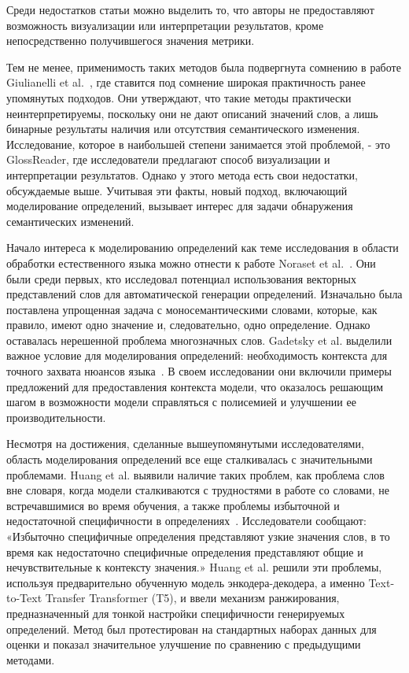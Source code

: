 \documentclass[LI,VKR]{HSEUniversity}
\begin{document}
Среди недостатков статьи можно выделить то, что авторы не предоставляют возможность визуализации
или интерпретации результатов, кроме непосредственно получившегося значения метрики.

Тем не менее, применимость таких методов была подвергнута сомнению в работе
Giulianelli et al.~\cite{DefinitionGenerationMainArticle},
где ставится под сомнение широкая практичность ранее упомянутых подходов.
Они утверждают, что такие методы практически неинтерпретируемы,
поскольку они не дают описаний значений слов,
а лишь бинарные результаты наличия или отсутствия семантического изменения.
Исследование, которое в наибольшей степени занимается этой проблемой, - это GlossReader,
где исследователи предлагают способ визуализации и интерпретации результатов.
Однако у этого метода есть свои недостатки, обсуждаемые выше.
Учитывая эти факты, новый подход, включающий моделирование определений,
вызывает интерес для задачи обнаружения семантических изменений.

Начало интереса к моделированию определений как теме исследования
в области обработки естественного языка можно отнести
к работе Noraset et al.~\cite{noraset2016definition}.
Они были среди первых, кто исследовал потенциал использования векторных представлений слов
для автоматической генерации определений.
Изначально была поставлена упрощенная задача с моносемантическими словами,
которые, как правило, имеют одно значение и, следовательно, одно определение.
Однако оставалась нерешенной проблема многозначных слов.
Gadetsky et al. выделили важное условие для моделирования определений:
необходимость контекста для точного захвата нюансов языка~\cite{gadetsky-etal-2018-conditional}.
В своем исследовании они включили примеры предложений для предоставления контекста модели,
что оказалось решающим шагом в возможности модели справляться с полисемией и улучшении
ее производительности.

Несмотря на достижения, сделанные вышеупомянутыми исследователями,
область моделирования определений все еще сталкивалась с значительными проблемами.
Huang et al. выявили наличие таких проблем,
как проблема слов вне словаря, когда модели сталкиваются с трудностями в работе со словами,
не встречавшимися во время обучения, а также проблемы избыточной и недостаточной
специфичности в определениях~\cite{huang-etal-2021-definition}.
Исследователи сообщают: «Избыточно специфичные определения представляют узкие значения слов,
в то время как недостаточно специфичные определения представляют общие и
нечувствительные к контексту значения.»
Huang et al. решили эти проблемы,
используя предварительно обученную модель энкодера-декодера,
а именно Text-to-Text Transfer Transformer (T5),
и ввели механизм ранжирования, предназначенный для тонкой настройки специфичности
генерируемых определений.
Метод был протестирован на стандартных наборах данных для оценки и показал значительное
улучшение по сравнению с предыдущими методами.
\end{document}
